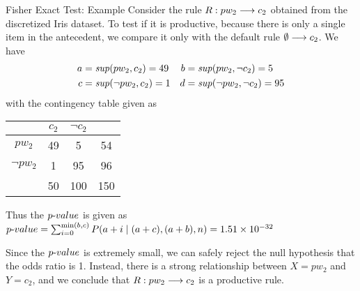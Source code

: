 \begin{frame}{Fisher Exact Test: Example}
  \small
  Consider the rule $R: pw_2 \arule c_2$ obtained from the discretized Iris
  dataset. To test if it is productive, because there is only a single
  item in the antecedent, we compare it only with the default rule
  $\emptyset \arule c_2$. We have
  \begin{align*}
    a & = \mathit{sup}(pw_2,c_2) = 49 &
    b & = \mathit{sup}(pw_2,\neg c_2) = 5\\
    c & = \mathit{sup}(\neg pw_2,c_2) = 1 &
    d & = \mathit{sup}(\neg pw_2, \neg c_2) = 95
  \end{align*}
  with the contingency table given as

  \begin{center}
{\renewcommand{\arraystretch}{1.1}  \begin{tabular}{|c|cc|c|}
    \hline
  & $c_2$ & $\neg c_2$ & \\ \hline
  $pw_2$ & 49 & 5 & 54\\
  $\neg pw_2$ & 1 & 95 & 96\\ \hline
  & 50 & 100 & 150\\ \hline
  \end{tabular}}
\end{center}

  Thus the ${p\text{-}value}$ is given as
    ${p\text{-}value}  = \sum_{i=0}^{\min(b,c)} P(a+i \mid (a+c),(a+b),n) = 
    1.51 \times 10^{-32}$

	\medskip
  Since the ${p\text{-}value}$ is extremely small, we can safely reject the null
  \hbox{hypothesis} that the odds ratio is 1. Instead, there is a strong
  relationship between $X=pw_2$ and $Y=c_2$, and we conclude
  that $R:pw_2\arule c_2$
  is a productive rule.
\end{frame}

